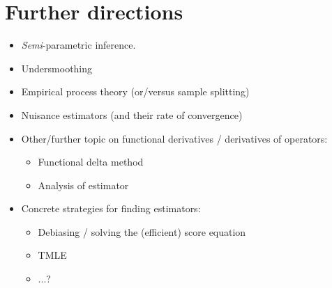 \documentclass[a4,danish]{article}
\begin{document}

\section{Further directions}
\label{sec:further-directions}

\begin{itemize}
\item \textit{Semi}-parametric inference.  
\item Undersmoothing
\item Empirical process theory (or/versus sample splitting)
\item Nuisance estimators (and their rate of convergence)
\item Other/further topic on functional derivatives / derivatives of operators:
  \begin{itemize}
  \item Functional delta method 
  \item Analysis of estimator
  \end{itemize}
\item Concrete strategies for finding estimators:
  \begin{itemize}
  \item Debiasing / solving the (efficient) score equation
  \item TMLE
  \item ...?
  \end{itemize}
\end{itemize}


\end{document}
